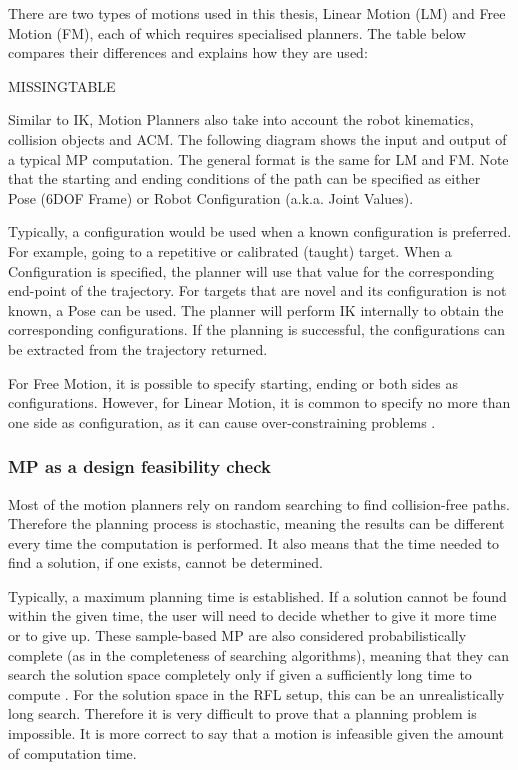 There are two types of motions used in this thesis, Linear Motion (LM) and Free Motion (FM), each of which requires specialised planners. The table below compares their differences and explains how they are used: 


MISSINGTABLE

Similar to IK, Motion Planners also take into account the robot kinematics, collision objects and ACM. The following diagram shows the input and output of a typical MP computation. The general format is the same for LM and FM. Note that the starting and ending conditions of the path can be specified as either Pose (6DOF Frame) or Robot Configuration (a.k.a. Joint Values). 

Typically, a configuration would be used when a known configuration is preferred. For example, going to a repetitive or calibrated (taught) target. When a Configuration is specified, the planner will use that value for the corresponding end-point of the trajectory. For targets that are novel and its configuration is not known, a Pose can be used. The planner will perform IK internally to obtain the corresponding configurations. If the planning is successful, the configurations can be extracted from the trajectory returned.

For Free Motion, it is possible to specify starting, ending or both sides as configurations. However, for Linear Motion, it is common to specify no more than one side as configuration, as it can cause over-constraining problems \parencite{berensonTaskSpaceRegions2011}.

\subsubsection{MP as a design feasibility check}
\label{subsubsection:exploration_2_mp_as_a_design_feasibility_check}

Most of the motion planners rely on random searching to find collision-free paths. Therefore the planning process is stochastic, meaning the results can be different every time the computation is performed. It also means that the time needed to find a solution, if one exists, cannot be determined. 

Typically, a maximum planning time is established. If a solution cannot be found within the given time, the user will need to decide whether to give it more time or to give up. These sample-based MP are also considered probabilistically complete (as in the completeness of searching algorithms), meaning that they can search the solution space completely only if given a sufficiently long time to compute \parencite{lavallePlanningAlgorithms2006}. For the solution space in the RFL setup, this can be an unrealistically long search. Therefore it is very difficult to prove that a planning problem is impossible. It is more correct to say that a motion is infeasible given the amount of computation time.

